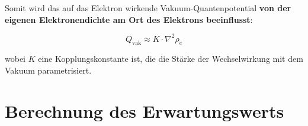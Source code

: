 Somit wird das auf das Elektron wirkende Vakuum-Quantenpotential \textbf{von der eigenen Elektronendichte am Ort des Elektrons beeinflusst}:

\begin{equation}
    Q_{\text{vak}} \approx K \cdot \nabla^2 \rho_e    
\end{equation}

wobei $K$ eine Kopplungskonstante ist, die die Stärke der Wechselwirkung mit dem Vakuum parametrisiert.

\section{Berechnung des Erwartungswerts}
